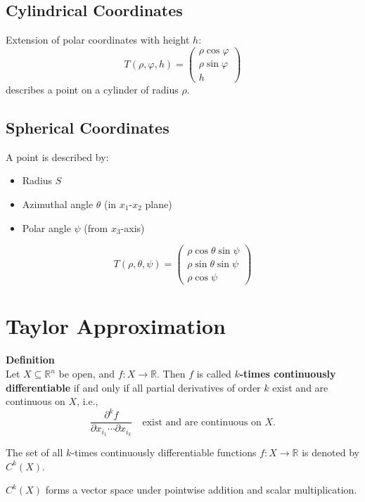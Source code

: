 \documentclass{article}
\begin{document}
\subsection{Cylindrical Coordinates}
Extension of polar coordinates with height $h$:
\[
T(\rho, \varphi, h) = 
\begin{pmatrix}
\rho \cos \varphi \\
\rho \sin \varphi \\
h
\end{pmatrix}
\]
describes a point on a cylinder of radius $\rho$.

\subsection{Spherical Coordinates}
A point is described by:
\begin{itemize}
    \item Radius $S$
    \item Azimuthal angle $\theta$ (in $x_1$-$x_2$ plane)
    \item Polar angle $\psi$ (from $x_3$-axis)
\end{itemize}
\[
T(\rho, \theta, \psi) = 
\begin{pmatrix}
\rho \cos \theta \sin \psi \\
\rho \sin \theta \sin \psi \\
\rho \cos \psi
\end{pmatrix}
\]
\vspace{20mm}
\section{Taylor Approximation}
\textbf{Definition} \\
Let \( X \subseteq \mathbb{R}^n \) be open, and \( f: X \to \mathbb{R} \). Then \( f \) is called 
\textbf{$k$-times continuously differentiable} if and only if all partial derivatives of order \( k \) exist and are continuous on \( X \), i.e.,
\[
\frac{\partial^k f}{\partial x_{i_1} \cdots \partial x_{i_k}} \quad \text{exist and are continuous on } X.
\]

The set of all $k$-times continuously differentiable functions \( f: X \to \mathbb{R} \) is denoted by \( C^k(X) \).

\( C^k(X) \) forms a vector space under pointwise addition and scalar multiplication.
\end{document}
